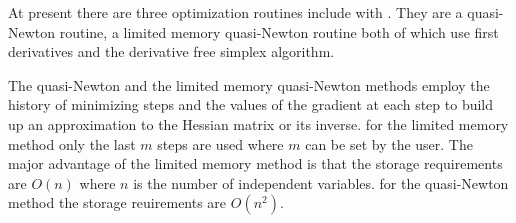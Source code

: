

At present there are three optimization routines include 
with \ADM. They are a quasi-Newton routine, a limited memory
quasi-Newton routine both of which use first derivatives 
and the derivative free simplex algorithm.  

The quasi-Newton  and the limited memory quasi-Newton
methods employ the history of minimizing steps and the
values of the gradient at each step to build up an 
approximation to the Hessian matrix or its inverse.
for the limited memory method only the last $m$ steps are
used where $m$ can be set by the user. The major advantage 
of the limited memory method is that the storage requirements
are $O(n)$ where $n$ is the number of independent variables.
for the quasi-Newton method the storage reuirements are
$O(n^2)$.
